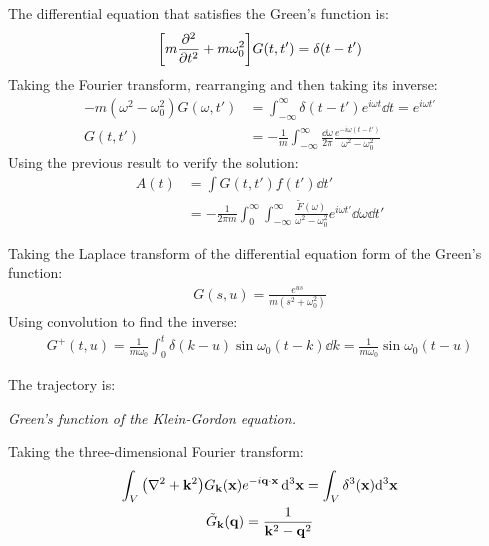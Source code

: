 \documentclass{report}
\begin{document}
\begin{subquests}
\begin{subquests}
		\item The differential equation that satisfies the Green's function is:
		\begin{gather*}
			\bqty{m\pdv[2]{t} + m\omega_0^2}G(t,t') = \delta(t-t')
		\end{gather*}
		Taking the Fourier transform, rearranging and then taking its inverse:
		\begin{align*}
			-m(\omega^2 - \omega_0^2)G(\omega,t') & = \int_{-\infty}^{\infty} \delta(t - t') e^{i\omega t} \dd{t} = e^{i\omega t'} \\
			G(t,t') & = -\frac{1}{m}\int_{-\infty}^{\infty}\frac{\dd{\omega}}{2\pi}\frac{e^{-i\omega(t-t')}}{\omega^2 - \omega_0^2} 
		\end{align*}
		Using the previous result to verify the solution:
		\begin{align*}
			A(t) & = \int G(t,t') f(t') \dd{t'} \\
			& = -\frac{1}{2\pi m}\int_0^{\infty}\int_{-\infty}^{\infty}\frac{\tilde F(\omega)}{\omega^2 - \omega_0^2}e^{i\omega t'}\dd{\omega}\dd{t'}
		\end{align*}

		\item Taking the Laplace transform of the differential equation form of the Green's function:
		\begin{gather*}
			G(s,u) = \frac{e^{us}}{m(s^2 + \omega_0^2)}
		\end{gather*}
		Using convolution to find the inverse:
		\begin{gather*}
			G^+(t,u) = \frac{1}{m\omega_0}\int_0^{t} \delta(k-u) \sin \omega_0(t - k) \dd{k}  = \frac{1}{m\omega_0}\sin\omega_0(t-u)
		\end{gather*}

		\item The trajectory is:
	\end{subquests}
	
	\item \emph{Green's function of the Klein-Gordon equation.}
	\begin{subquests}
		\item Taking the three-dimensional Fourier transform:
		\begin{gather*}
			\int_V \pqty{\nabla^2 + \mathbf k^2}G_{\mathbf k}(\mathbf x)e^{-i\vb q\cdot \vb x}\,\dd^3{\vb x} = \int_V \delta^3(\mathbf x) \dd^3{\mathbf x} \\
			\tilde G_{\mathbf k}(\vb q) = \frac{1}{\mathbf k^2 - \vb q^2}
		\end{gather*}
		

\end{subquests}
\end{subquests}
\end{document}
